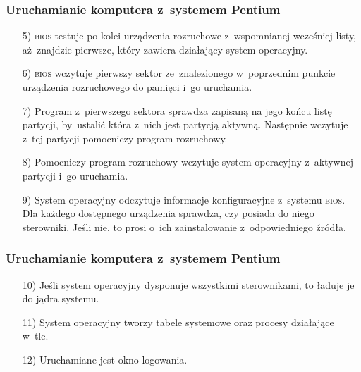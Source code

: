 \documentclass[10pt,t]{beamer}
\begin{document}
\begin{frame}
  \frametitle{Uruchamianie komputera z~systemem Pentium}


  \begin{itemize}

  \item[5)] \textsc{bios} testuje po kolei urządzenia rozruchowe
    z~wspomnianej wcześniej listy, aż~znajdzie pierwsze, który zawiera
    działający system operacyjny.



  \item[6)] \textsc{bios} wczytuje pierwszy sektor ze~znalezionego
    w~poprzednim punkcie urządzenia rozruchowego do pamięci i~go uruchamia.




  \item[7)] Program z~pierwszego sektora sprawdza zapisaną na jego końcu
    listę partycji, by~ustalić która z~nich jest partycją aktywną.
    Następnie wczytuje z~tej partycji pomocniczy program rozruchowy.



  \item[8)] Pomocniczy program rozruchowy wczytuje system operacyjny
    z~aktywnej partycji i~go uruchamia.



  \item[9)] System operacyjny odczytuje informacje konfiguracyjne z~systemu
    \textsc{bios}. Dla każdego dostępnego urządzenia sprawdza, czy posiada
    do niego sterowniki. Jeśli nie, to prosi o~ich zainstalowanie
    z~odpowiedniego źródła.

  \end{itemize}

\end{frame}





\begin{frame}
  \frametitle{Uruchamianie komputera z~systemem Pentium}


  \begin{itemize}

  \item[10)] Jeśli system operacyjny dysponuje wszystkimi sterownikami,
    to ładuje je do jądra systemu.



  \item[11)] System operacyjny tworzy tabele systemowe oraz procesy
    działające w~tle.



  \item[12)] Uruchamiane jest okno logowania.

  \end{itemize}

\end{frame}
\end{document}
